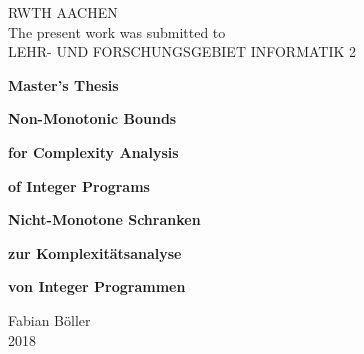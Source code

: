 \documentclass{masterthesis}
\begin{document}
\begin{titlepage}

\thispagestyle{empty}

\begin{center}
  
  {\huge RWTH AACHEN\\[5mm]}
  The present work was submitted to \\
  LEHR- UND FORSCHUNGSGEBIET INFORMATIK 2\\
  
  \vspace*{2.5cm}
  
  {\huge \textbf{Master's Thesis}}\\ 
  
  \vspace{2.5cm}

  {\LARGE \textbf{Non-Monotonic Bounds}}\\ 

  \vspace*{3mm}

  {\LARGE \textbf{for Complexity Analysis}}\\ 

  \vspace*{3mm}

  {\LARGE \textbf{of Integer Programs}}\\

  \vspace{2cm}
  
  {\LARGE \textbf{Nicht-Monotone Schranken}}\\ 

  \vspace*{3mm}

  {\LARGE \textbf{zur Komplexitätsanalyse}}\\ 

  \vspace*{3mm}

  {\LARGE \textbf{von Integer Programmen}}\\
  
  \vspace{3cm}
  
  {\huge Fabian Böller}\\[1cm]
  
  {\huge 2018}\\[1cm]


\end{center}
\end{titlepage}
\end{document}
